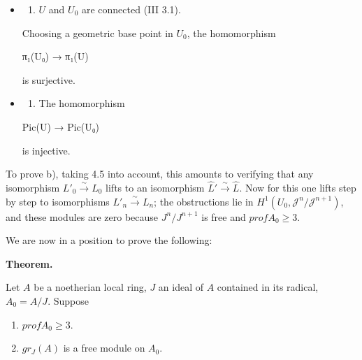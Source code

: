 \documentclass[
]{article}
\newenvironment{Shaded}{}{}
\newcommand{\NormalTok}[1]{#1}
\providecommand{\tightlist}{%
  \setlength{\itemsep}{0pt}\setlength{\parskip}{0pt}}
\begin{document}
\begin{itemize}
\item
  \begin{enumerate}
  \def\labelenumi{\alph{enumi})}
  \tightlist
  \item
    \(U\) and \(U_{0}\) are connected (III 3.1).
  \end{enumerate}

  Choosing a geometric base point in \(U_{0}\), the homomorphism

\begin{Shaded}
\begin{Highlighting}[]
\NormalTok{π₁(U₀) → π₁(U)}
\end{Highlighting}
\end{Shaded}

  is surjective.
\item
  \begin{enumerate}
  \def\labelenumi{\alph{enumi})}
  \setcounter{enumi}{1}
  \tightlist
  \item
    The homomorphism
  \end{enumerate}

\begin{Shaded}
\begin{Highlighting}[]
\NormalTok{Pic(U) → Pic(U₀)}
\end{Highlighting}
\end{Shaded}

  is injective.
\end{itemize}

To prove b), taking 4.5 into account, this amounts to verifying that any
isomorphism \(L'_{0} \xrightarrow{\sim} L_{0}\) lifts to an isomorphism
\(\hat{L}' \xrightarrow{\sim} \hat{L}\). Now for this one lifts step by
step to isomorphisms \(L'_{n} \xrightarrow{\sim} L_{n}\); the
obstructions lie in \(H^{1}(U_{0}, \mathcal{J}^{n}/\mathcal{J}^{n+1})\),
and these modules are zero because \(J^{n}/J^{n+1}\) is free and
\(prof A_{0} \geqslant 3\).

We are now in a position to prove the following:

\textbf{Theorem.}

Let \(A\) be a noetherian local ring, \(J\) an ideal of \(A\) contained
in its radical, \(A_{0} = A/J\). Suppose

\begin{enumerate}
\def\labelenumi{\arabic{enumi}.}
\tightlist
\item
  \(prof A_{0} \geqslant 3\).
\item
  \(gr_{J}(A)\) is a free module on \(A_{0}\).
\end{enumerate}
\end{document}
